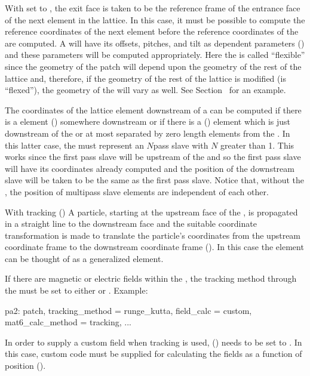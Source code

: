 With  set to , the exit face is taken to be the reference frame of the
entrance face of the next element in the lattice. In this case, it must be possible to compute the
reference coordinates of the next element before the reference coordinates of the  are
computed. A   will have its offsets, pitches, and tilt as dependent
parameters () and these parameters will be computed appropriately. Here the
 is called ``flexible'' since the geometry of the patch will depend upon the geometry of
the rest of the lattice and, therefore, if the geometry of the rest of the lattice is modified (is
``flexed''), the geometry of the  will vary as well. See Section~ for an
example.

The coordinates of the lattice element downstream of a   can be computed
if there is a  element () somewhere downstream or if there is a
 () element which is just downstream of the  or at
most separated by zero length elements from the . In this latter case, the
 must represent an $N$\Th pass slave with $N$ greater than 1. This works since
the first pass slave will be upstream of the  and so the first pass slave will have its
coordinates already computed and the position of the downstream slave will be taken to be the same
as the first pass slave. Notice that, without the , the position of multipass slave
elements are independent of each other.

With  tracking () A particle, starting at the upstream face of the
, is propagated in a straight line to the downstream face and the suitable coordinate
transformation is made to translate the particle's coordinates from the upstream coordinate frame to
the downstream coordinate frame (). In this case the  element can be
thought of as a generalized  element.

If there are magnetic or electric fields within the , the tracking method through the
 must be set to either  or . Example:
\begin{example}
  pa2: patch, tracking_method = runge_kutta, field_calc = custom, 
              mat6_calc_method = tracking, ...
\end{example}
In order to supply a custom field when  tracking is used, 
() needs to be set to . In this case, custom code must be supplied for
calculating the fields as a function of position ().

